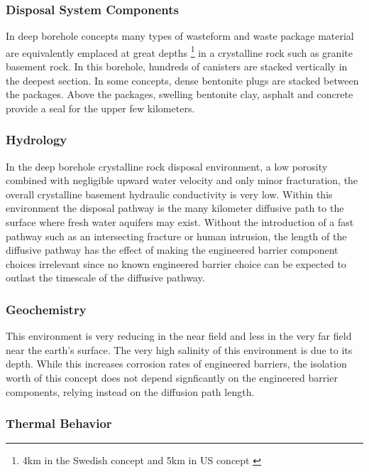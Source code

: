

\subsubsection{Disposal System Components}

In deep borehole concepts many types of  wasteform and waste package material 
are equivalently emplaced at great depths \footnote{4km in the Swedish concept 
and 5km in \gls{US} concept \cite{hardin_generic_2011, clayton_generic_2011} }
in a crystalline rock such as granite basement rock. In this borehole, hundreds
of canisters are stacked vertically in the deepest section. In some concepts, 
dense bentonite plugs are stacked between the packages. Above the packages, 
swelling bentonite clay, asphalt and concrete provide a seal for the upper few 
kilometers. 

\subsubsection{Hydrology}

In the deep borehole crystalline rock disposal environment, a low porosity
combined with negligible upward water velocity and only minor fracturation, the
overall crystalline basement hydraulic conductivity is very low. Within this 
environment the disposal pathway is the many kilometer diffusive path to the 
surface where fresh water aquifers may exist\cite{clayton_generic_2011}.
Without the introduction of a fast 
pathway such as an intersecting fracture or human intrusion, the length of the
diffusive pathway has the effect of making the engineered barrier component 
choices irrelevant since no known engineered barrier choice can be expected to 
outlast the timescale of the diffusive pathway.

\subsubsection{Geochemistry}

This environment is very reducing in the near field and less in the very 
far field near the earth's surface. The very high salinity of this environment
is due to its depth. While this increases corrosion rates of engineered 
barriers, the isolation worth of this concept does not depend signficantly on 
the engineered barrier components, relying instead on the diffusion path length.

\subsubsection{Thermal Behavior}
\label{subsec:boreholethermal}


